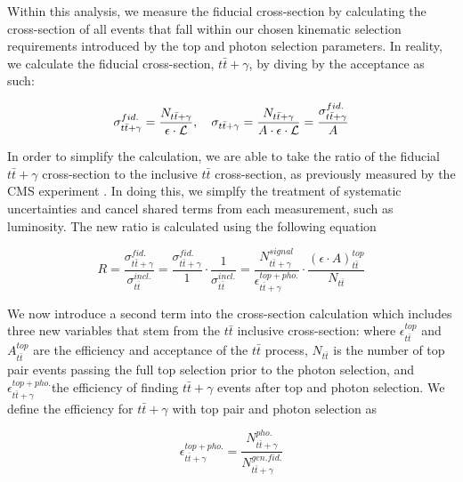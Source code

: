 Within this analysis, we measure the fiducial cross-section by calculating the cross-section of all events that fall within our chosen kinematic selection requirements introduced by the top and photon selection parameters. In reality, we calculate the fiducial cross-section, $t\bar{t}+\gamma$, by diving by the acceptance as such:

\begin{equation}
\sigma_{t\bar{t}+\gamma}^{fid.} = \frac{N_{t\bar{t}+\gamma}}{\epsilon \cdot \mathcal{L}}, \quad \sigma_{t\bar{t}+\gamma} = \frac{N_{t\bar{t}+\gamma}}{A \cdot \epsilon \cdot \mathcal{L}} = \frac{\sigma_{t\bar{t}+\gamma}^{fid.}}{A}
\end{equation}

In order to simplify the calculation, we are able to take the ratio of the fiducial $t\bar{t}+\gamma$ cross-section to the inclusive $t\bar{t}$ cross-section, as previously measured by the CMS experiment \cite{ttbarXsectiondilepton}. In doing this, we simplfy the treatment of systematic uncertainties and cancel shared terms from each measurement, such as luminosity. The new ratio is calculated using the following equation

\begin{equation}
R = \frac{\sigma_{t\bar{t}+\gamma}^{fid.}}{\sigma_{t\bar{t}}^{incl.}} = \frac{\sigma_{t\bar{t}+\gamma}^{fid.}}{1}\cdot\frac{1}{\sigma_{t\bar{t}}^{incl.}} = \frac{N_{t\bar{t}+\gamma}^{signal}}{\epsilon_{t\bar{t}+\gamma}^{top+pho.}} \cdot \frac{(\epsilon \cdot A)_{t\bar{t}}^{top}}{N_{t\bar{t}}}
\end{equation}

We now introduce a second term into the cross-section calculation which includes three new variables that stem from the $t\bar{t}$ inclusive cross-section: where $\epsilon_{t\bar{t}}^{top}$ and $A_{t\bar{t}}^{top}$ are the efficiency and acceptance of the $t\bar{t}$ process, $N_{t\bar{t}}$ is the number of top pair events passing the full top selection prior to the photon selection, and $\epsilon_{t\bar{t}+\gamma}^{top+pho.}$the efficiency of finding $t\bar{t}+\gamma$ events after top and photon selection. We define the efficiency for $t\bar{t}+\gamma$ with top pair and photon selection as

\begin{equation}
\epsilon_{t\bar{t}+\gamma}^{top+pho.} = \frac{N_{t\bar{t}+\gamma}^{pho.}}{N_{t\bar{t}+\gamma}^{gen. fid.}}
\end{equation}


